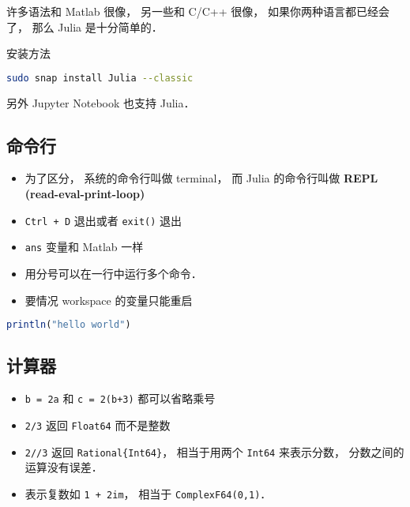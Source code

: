 
\begin{issues}
\issueDraft
\end{issues}

许多语法和 Matlab 很像， 另一些和 C/C++ 很像， 如果你两种语言都已经会了， 那么 Julia 是十分简单的．

安装方法
\begin{lstlisting}[language=bash]
sudo snap install Julia --classic
\end{lstlisting}

另外 Jupyter Notebook 也支持 Julia．

\subsection{命令行}
\begin{itemize}
\item 为了区分， 系统的命令行叫做 terminal， 而 Julia 的命令行叫做 \textbf{REPL (read-eval-print-loop)}
\item \verb|Ctrl + D| 退出或者 \verb|exit()| 退出
\item \verb|ans| 变量和 Matlab 一样
\item 用分号可以在一行中运行多个命令．
\item 要情况 workspace 的变量只能重启
\end{itemize}

\begin{lstlisting}[language=Julia]
println("hello world")
\end{lstlisting}

\subsection{计算器}
\begin{itemize}
\item \verb|b = 2a| 和 \verb|c = 2(b+3)| 都可以省略乘号
\item \verb|2/3| 返回 \verb|Float64| 而不是整数
\item \verb|2//3| 返回 \verb|Rational{Int64}|， 相当于用两个 \verb|Int64| 来表示分数， 分数之间的运算没有误差．
\item 表示复数如 \verb|1 + 2im|， 相当于 \verb|ComplexF64(0,1)|．
\end{itemize}


